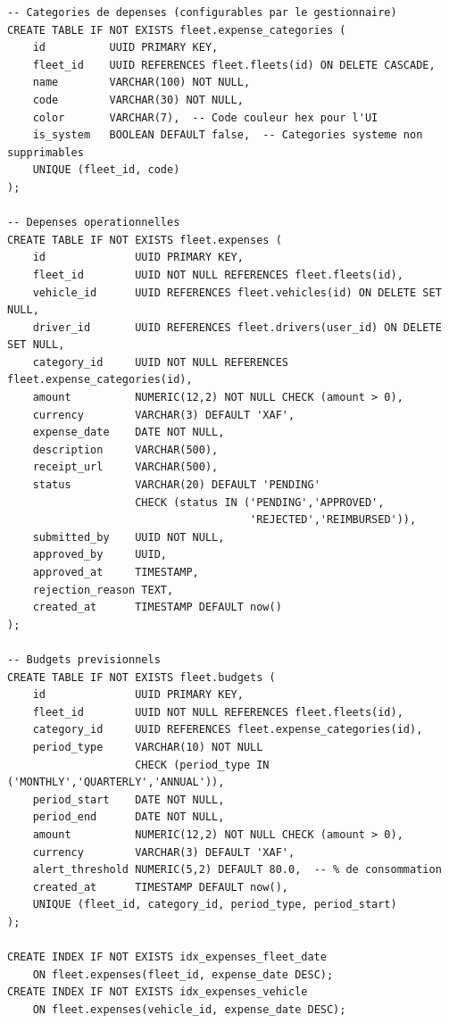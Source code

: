 \documentclass[12pt,a4paper]{report}
\begin{document}
\begin{lstlisting}[style=sqlStyle, caption={Tables du module Dépenses et Budget}]
-- Categories de depenses (configurables par le gestionnaire)
CREATE TABLE IF NOT EXISTS fleet.expense_categories (
    id          UUID PRIMARY KEY,
    fleet_id    UUID REFERENCES fleet.fleets(id) ON DELETE CASCADE,
    name        VARCHAR(100) NOT NULL,
    code        VARCHAR(30) NOT NULL,
    color       VARCHAR(7),  -- Code couleur hex pour l'UI
    is_system   BOOLEAN DEFAULT false,  -- Categories systeme non supprimables
    UNIQUE (fleet_id, code)
);

-- Depenses operationnelles
CREATE TABLE IF NOT EXISTS fleet.expenses (
    id              UUID PRIMARY KEY,
    fleet_id        UUID NOT NULL REFERENCES fleet.fleets(id),
    vehicle_id      UUID REFERENCES fleet.vehicles(id) ON DELETE SET NULL,
    driver_id       UUID REFERENCES fleet.drivers(user_id) ON DELETE SET NULL,
    category_id     UUID NOT NULL REFERENCES fleet.expense_categories(id),
    amount          NUMERIC(12,2) NOT NULL CHECK (amount > 0),
    currency        VARCHAR(3) DEFAULT 'XAF',
    expense_date    DATE NOT NULL,
    description     VARCHAR(500),
    receipt_url     VARCHAR(500),
    status          VARCHAR(20) DEFAULT 'PENDING'
                    CHECK (status IN ('PENDING','APPROVED',
                                      'REJECTED','REIMBURSED')),
    submitted_by    UUID NOT NULL,
    approved_by     UUID,
    approved_at     TIMESTAMP,
    rejection_reason TEXT,
    created_at      TIMESTAMP DEFAULT now()
);

-- Budgets previsionnels
CREATE TABLE IF NOT EXISTS fleet.budgets (
    id              UUID PRIMARY KEY,
    fleet_id        UUID NOT NULL REFERENCES fleet.fleets(id),
    category_id     UUID REFERENCES fleet.expense_categories(id),
    period_type     VARCHAR(10) NOT NULL
                    CHECK (period_type IN ('MONTHLY','QUARTERLY','ANNUAL')),
    period_start    DATE NOT NULL,
    period_end      DATE NOT NULL,
    amount          NUMERIC(12,2) NOT NULL CHECK (amount > 0),
    currency        VARCHAR(3) DEFAULT 'XAF',
    alert_threshold NUMERIC(5,2) DEFAULT 80.0,  -- % de consommation
    created_at      TIMESTAMP DEFAULT now(),
    UNIQUE (fleet_id, category_id, period_type, period_start)
);

CREATE INDEX IF NOT EXISTS idx_expenses_fleet_date
    ON fleet.expenses(fleet_id, expense_date DESC);
CREATE INDEX IF NOT EXISTS idx_expenses_vehicle
    ON fleet.expenses(vehicle_id, expense_date DESC);
\end{lstlisting}
\end{document}
